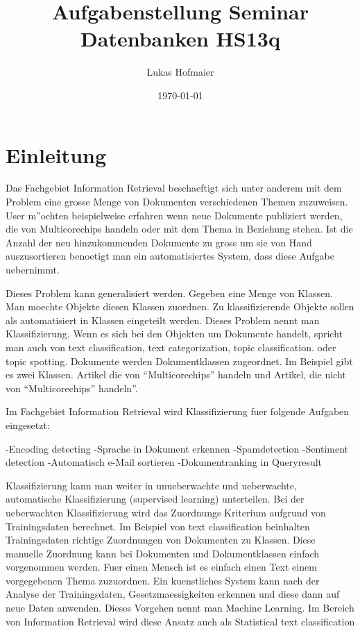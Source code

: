 \documentclass[11pt]{article}
\title{Aufgabenstellung Seminar Datenbanken HS13q}
\author{Lukas Hofmaier}
\date{\today}
\begin{document}
\maketitle

\setcounter{tocdepth}{3}

\vspace*{1cm}
\section{Einleitung}
\label{sec-1}

Das Fachgebiet Information Retrieval beschaeftigt sich unter anderem mit dem Problem eine grosse Menge von Dokumenten verschiedenen Themen zuzuweisen. User m''ochten beispielweise erfahren wenn neue Dokumente publiziert werden, die von Multicorechips handeln oder mit dem Thema in Beziehung stehen. Ist die Anzahl der neu hinzukommenden Dokumente zu gross um sie von Hand auszusortieren benoetigt man ein automatisiertes System, dass diese Aufgabe uebernimmt.

Dieses Problem kann generalisiert werden. Gegeben eine Menge von Klassen. Man moechte Objekte diesen Klassen zuordnen. Zu klassifizierende Objekte sollen als automatisiert in Klassen eingeteilt werden. Dieses Problem nennt man Klassifizierung. Wenn es sich bei den Objekten um Dokumente handelt, spricht man auch von text classification, text categorization, topic classification. oder topic spotting. Dokumente werden Dokumentklassen zugeordnet. Im Beispiel gibt es zwei Klassen. Artikel die von ``Multicorechips'' handeln und Artikel, die nicht von ``Multicorechips'' handeln''.

Im Fachgebiet Information Retrieval wird Klassifizierung fuer folgende Aufgaben eingesetzt:

-Encoding detecting
-Sprache in Dokument erkennen
-Spamdetection
-Sentiment detection
-Automatisch e-Mail sortieren
-Dokumentranking in Queryresult

Klassifizierung kann man weiter in unueberwachte und ueberwachte, automatische Klassifizierung (supervised learning) unterteilen. Bei der ueberwachten Klassifizierung wird das Zuordnungs Kriterium aufgrund von Trainingsdaten berechnet. Im Beispiel von text classification beinhalten Trainingsdaten richtige Zuordnungen von Dokumenten zu Klassen. Diese manuelle Zuordnung kann bei Dokumenten und Dokumentklassen einfach vorgenommen werden. Fuer einen Mensch ist es einfach einen Text einem vorgegebenen Thema zuzuordnen. Ein kuenstliches System kann nach der Analyse der Trainingsdaten, Gesetzmaessigkeiten erkennen und diese dann auf neue Daten anwenden. Dieses Vorgehen nennt man Machine Learning. Im Bereich von Information Retrieval wird diese Ansatz auch als Statistical text classification 
\end{document}
